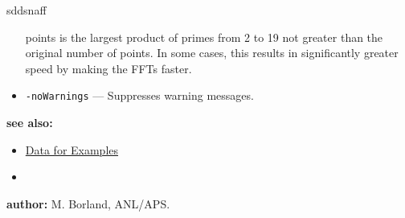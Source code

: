 \begin{sddsprog}{sddsnaff}
\begin{itemize}
        points is the largest product of primes from 2 to 19 not greater than the original number of
        points. In some cases, this results in significantly greater speed by making the FFTs faster.
      \item \verb|-noWarnings| --- Suppresses warning messages.
    \end{itemize}
  \item \textbf{see also:}
    \begin{itemize}
      \item \hyperref[exampleData]{Data for Examples}
      \item {}
    \end{itemize}
  \item \textbf{author:} M. Borland, ANL/APS.
\end{sddsprog}

